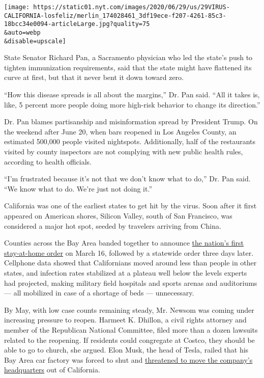 \texttt{[image: https://static01.nyt.com/images/2020/06/29/us/29VIRUS-CALIFORNIA-losfeliz/merlin\_174028461\_3df19ece-f207-4261-85c3-18bcc34e0094-articleLarge.jpg?quality=75\\\&auto=webp\\\&disable=upscale]}

State Senator Richard Pan, a Sacramento physician who led the state's
push to tighten immunization requirements, said that the state might
have flattened its curve at first, but that it never bent it down toward
zero.

``How this disease spreads is all about the margins,'' Dr. Pan said.
``All it takes is, like, 5 percent more people doing more high-risk
behavior to change its direction.''

Dr. Pan blames partisanship and misinformation spread by President
Trump. On the weekend after June 20, when bars reopened in Los Angeles
County, an estimated 500,000 people visited nightspots. Additionally,
half of the restaurants visited by county inspectors are not complying
with new public health rules, according to health officials.

``I'm frustrated because it's not that we don't know what to do,'' Dr.
Pan said. ``We know what to do. We're just not doing it.''

California was one of the earliest states to get hit by the virus. Soon
after it first appeared on American shores, Silicon Valley, south of San
Francisco, was considered a major hot spot, seeded by travelers arriving
from China.

Counties across the Bay Area banded together to announce
\href{https://www.nytimes.com/2020/03/16/us/california-covid-19.html}{the
nation's first stay-at-home order} on March 16, followed by a statewide
order three days later. Cellphone data showed that Californians moved
around less than people in other states, and infection rates stabilized
at a plateau well below the levels experts had projected, making
military field hospitals and sports arenas and auditoriums --- all
mobilized in case of a shortage of beds --- unnecessary.

By May, with low case counts remaining steady, Mr. Newsom was coming
under increasing pressure to reopen. Harmeet K. Dhillon, a civil rights
attorney and member of the Republican National Committee, filed more
than a dozen lawsuits related to the reopening. If residents could
congregate at Costco, they should be able to go to church, she argued.
Elon Musk, the head of Tesla, railed that his Bay Area car factory was
forced to shut and
\href{https://www.nytimes.com/2020/05/09/business/coronavirus-elon-musk-tesla-california.html}{threatened
to move the company's headquarters} out of California.

